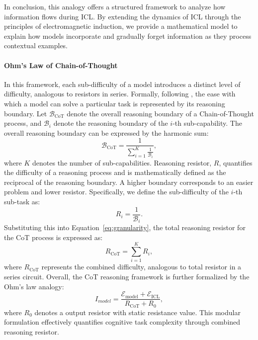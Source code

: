In conclusion, this analogy offers a structured framework to analyze how information flows during ICL. By extending the dynamics of ICL through the principles of electromagnetic induction, we provide a mathematical model to explain how models incorporate and gradually forget information as they process contextual examples.

\paragraph{Ohm's Law of Chain-of-Thought}
In this framework, each sub-difficulty of a model introduces a distinct level of difficulty, analogous to resistors in series.
Formally, following \citet{chen2024unlocking}, the ease with which a model can solve a particular task is represented by its reasoning boundary. Let \( \mathcal{B}_{\text{CoT}} \) denote the overall reasoning boundary of a Chain-of-Thought process, and \( \mathcal{B}_{i} \) denote the reasoning boundary of the \(i\)-th sub-capability. The overall reasoning boundary can be expressed by the harmonic sum:
\begin{equation}
\mathcal{B}_{\text{CoT}} = \frac{1}{\sum^K_{i=1} \frac{1}{\mathcal{B}_{i}}}, \label{eq:granularity}
\end{equation}
where $K$ denotes the number of sub-capabilities.
Reasoning resistor, $R$, quantifies the difficulty of a reasoning process and is mathematically defined as the reciprocal of the reasoning boundary. A higher boundary corresponds to an easier problem and lower resistor. Specifically, we define the sub-difficulty of the $i$-th sub-task as:
\begin{equation}
    R_i = \frac{1}{\mathcal{B}_{i}}.
\end{equation}
Substituting this into Equation~\ref{eq:granularity}, the total reasoning resistor for the CoT process is expressed as:
\begin{equation}
    R_{\text{CoT}} = \sum^K_{i=1} R_i, \label{eq:resistor}
\end{equation}
where $R_{\text{CoT}}$ represents the combined difficulty, analogous to total resistor in a series circuit.
Overall, the CoT reasoning framework is further formalized by the Ohm's law analogy:
\begin{equation}
    I_{model} = \frac{\mathcal{E}_{\text{model}} + \mathcal{E}_{\text{ICL}}}{R_{\text{CoT}} + R_0},
    \label{eq:ohm2}
\end{equation}
where $R_0$ denotes a output resistor with static resistance value. This modular formulation effectively quantifies cognitive task complexity through combined reasoning resistor.


